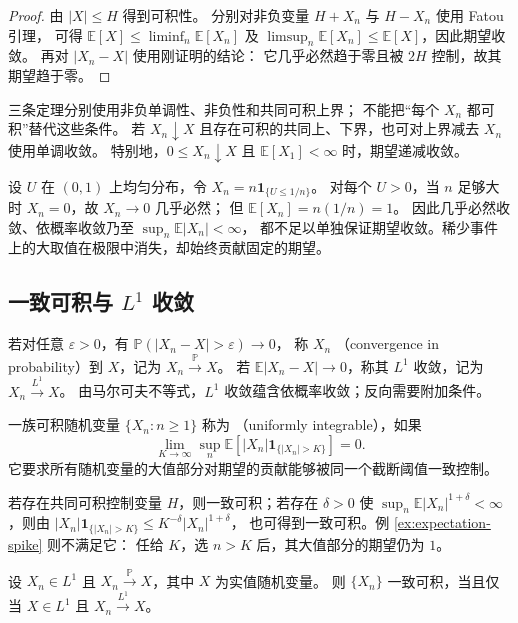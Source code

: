\documentclass[UTF8]{ctexart}
\begin{document}
\begin{proof}
由 $|X|\leq H$ 得到可积性。
分别对非负变量 $H+X_n$ 与 $H-X_n$ 使用 Fatou 引理，
可得 $\mathbb E[X]\leq\liminf_n\mathbb E[X_n]$
及 $\limsup_n\mathbb E[X_n]\leq\mathbb E[X]$，因此期望收敛。
再对 $|X_n-X|$ 使用刚证明的结论：
它几乎必然趋于零且被 $2H$ 控制，故其期望趋于零。
\end{proof}

三条定理分别使用非负单调性、非负性和共同可积上界；
不能把“每个 $X_n$ 都可积”替代这些条件。
若 $X_n\downarrow X$ 且存在可积的共同上、下界，也可对上界减去 $X_n$ 使用单调收敛。
特别地，$0\leq X_n\downarrow X$ 且 $\mathbb E[X_1]<\infty$ 时，期望递减收敛。

\begin{example}[几乎必然收敛仍可能丢失期望]
\label{ex:expectation-spike}
设 $U$ 在 $(0,1)$ 上均匀分布，令
$X_n=n\mathbf1_{\{U\leq1/n\}}$。
对每个 $U>0$，当 $n$ 足够大时 $X_n=0$，故 $X_n\to0$ 几乎必然；
但 $\mathbb E[X_n]=n(1/n)=1$。
因此几乎必然收敛、依概率收敛乃至 $\sup_n\mathbb E|X_n|<\infty$，
都不足以单独保证期望收敛。稀少事件上的大取值在极限中消失，却始终贡献固定的期望。
\end{example}

\subsection{一致可积与 \texorpdfstring{$L^1$}{L1} 收敛}

若对任意 $\varepsilon>0$，有 $\mathbb P(|X_n-X|>\varepsilon)\to0$，
称 $X_n$ （convergence in probability）到 $X$，记为 $X_n\xrightarrow{\mathbb P}X$。
若 $\mathbb E|X_n-X|\to0$，称其 $L^1$ 收敛，记为 $X_n\xrightarrow{L^1}X$。
由马尔可夫不等式，$L^1$ 收敛蕴含依概率收敛；反向需要附加条件。

\begin{definition}[一致可积]
\label{def:expectation-ui}
一族可积随机变量 $\{X_n:n\geq1\}$ 称为
（uniformly integrable），如果
\[
  \lim_{K\to\infty}\sup_n
  \mathbb E[|X_n|\mathbf1_{\{|X_n|>K\}}]=0.
\]
它要求所有随机变量的大值部分对期望的贡献能够被同一个截断阈值一致控制。
\end{definition}

若存在共同可积控制变量 $H$，则一致可积；若存在 $\delta>0$ 使
$\sup_n\mathbb E|X_n|^{1+\delta}<\infty$，则由
$|X_n|\mathbf1_{\{|X_n|>K\}}\leq K^{-\delta}|X_n|^{1+\delta}$，
也可得到一致可积。例 \ref{ex:expectation-spike} 则不满足它：
任给 $K$，选 $n>K$ 后，其大值部分的期望仍为 $1$。

\begin{theorem}[一致可积的收敛判据]
\label{thm:expectation-ui}
设 $X_n\in L^1$ 且 $X_n\xrightarrow{\mathbb P}X$，其中 $X$ 为实值随机变量。
则 $\{X_n\}$ 一致可积，当且仅当 $X\in L^1$ 且 $X_n\xrightarrow{L^1}X$。
\end{theorem}
\end{document}
